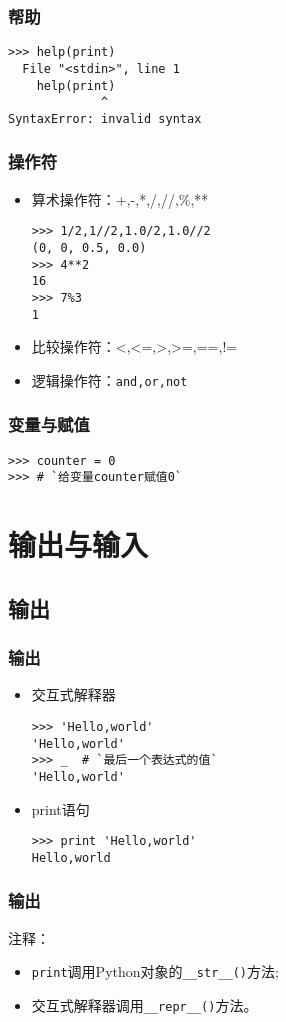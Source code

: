 \documentclass[13pt]{beamer}
\begin{document}
\begin{frame}[containsverbatim]
\frametitle{帮助}
\begin{lstlisting}
>>> help(print)
  File "<stdin>", line 1
    help(print)
             ^
SyntaxError: invalid syntax
\end{lstlisting}
\end{frame}

\begin{frame}[containsverbatim]
\frametitle{操作符}
\begin{itemize}
\item 算术操作符：+,-,*,/,//,\%,**
\begin{lstlisting}
>>> 1/2,1//2,1.0/2,1.0//2
(0, 0, 0.5, 0.0)
>>> 4**2
16
>>> 7%3
1
\end{lstlisting}
\item 比较操作符：<,<=,>,>=,==,!=
\item 逻辑操作符：\lstinline{and,or,not}
\end{itemize}
\end{frame}

\begin{frame}[containsverbatim]
\frametitle{变量与赋值}
\begin{lstlisting}
>>> counter = 0
>>> # `给变量counter赋值0`
\end{lstlisting}
\end{frame}

\section{输出与输入}
\subsection{输出}
\begin{frame}[containsverbatim]
\frametitle{输出}
\begin{itemize}
  \item 交互式解释器
\begin{lstlisting}
>>> 'Hello,world'
'Hello,world'
>>> _  # `最后一个表达式的值`
'Hello,world'
\end{lstlisting}
  \item print语句
\begin{lstlisting}
>>> print 'Hello,world'
Hello,world
\end{lstlisting}
\end{itemize}
\end{frame}

\begin{frame}
\frametitle{输出}
注释：
\begin{itemize}
\item \lstinline{print}调用Python对象的\lstinline{__str__()}方法;
\item 交互式解释器调用\lstinline{__repr__()}方法。
\end{itemize}
\end{frame}
\end{document}
